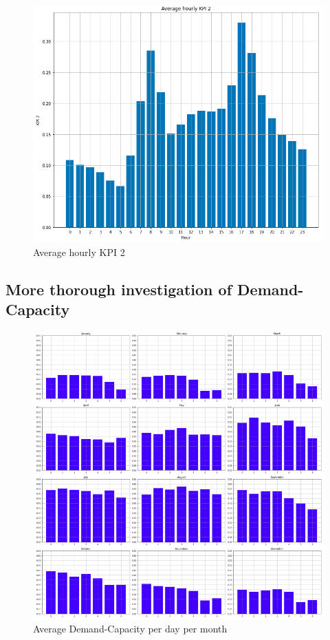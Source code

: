 \begin{figure}[H]
   \centering
    \includegraphics[width=0.8\linewidth]{./Figures/kpi2abb3.png}
    \caption{Average hourly KPI 2}
    \label{kpi2abb3}
\end{figure}

\subsection*{More thorough investigation of Demand-Capacity}
\label{app:A2}

\begin{figure}[H]
   \centering
    \includegraphics[width=0.8\linewidth]{./Figures/APP1_1.png}
    \caption{Average Demand-Capacity per day per month}
    \label{APP1-1}
\end{figure}

